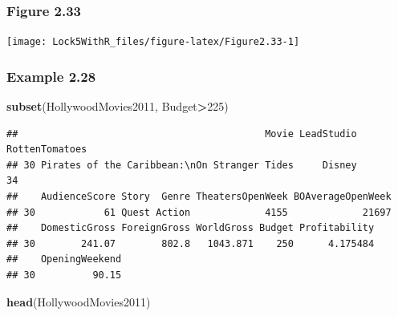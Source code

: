 \documentclass[]{book}
\newenvironment{Shaded}{\begin{snugshade}}{\end{snugshade}}
\newcommand{\DataTypeTok}[1]{\textcolor[rgb]{0.13,0.29,0.53}{#1}}
\newcommand{\DecValTok}[1]{\textcolor[rgb]{0.00,0.00,0.81}{#1}}
\newcommand{\KeywordTok}[1]{\textcolor[rgb]{0.13,0.29,0.53}{\textbf{#1}}}
\newcommand{\NormalTok}[1]{#1}
\newcommand{\OperatorTok}[1]{\textcolor[rgb]{0.81,0.36,0.00}{\textbf{#1}}}
\newcommand{\StringTok}[1]{\textcolor[rgb]{0.31,0.60,0.02}{#1}}
\begin{document}
\hypertarget{figure-2.33}{%
\subsubsection{Figure 2.33}\label{figure-2.33}}

\begin{Shaded}
\end{Shaded}

\texttt{[image: Lock5WithR\_files/figure-latex/Figure2.33-1]}

\hypertarget{example-2.28}{%
\subsubsection{Example 2.28}\label{example-2.28}}

\begin{Shaded}
\begin{Highlighting}[]
\KeywordTok{subset}\NormalTok{(HollywoodMovies2011, Budget}\OperatorTok{>}\DecValTok{225}\NormalTok{)}
\end{Highlighting}
\end{Shaded}

\begin{verbatim}
##                                           Movie LeadStudio RottenTomatoes
## 30 Pirates of the Caribbean:\nOn Stranger Tides     Disney             34
##    AudienceScore Story  Genre TheatersOpenWeek BOAverageOpenWeek
## 30            61 Quest Action             4155             21697
##    DomesticGross ForeignGross WorldGross Budget Profitability
## 30        241.07        802.8   1043.871    250      4.175484
##    OpeningWeekend
## 30          90.15
\end{verbatim}

\begin{Shaded}
\begin{Highlighting}[]
\KeywordTok{head}\NormalTok{(HollywoodMovies2011)}
\end{Highlighting}
\end{Shaded}
\end{document}
